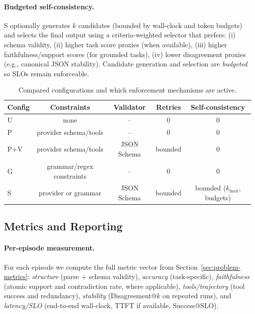 \documentclass[11pt]{article}
\newcommand{\slo}{\ensuremath{\mathrm{SLO}}}
\begin{document}
\paragraph{Budgeted self-consistency.}
S optionally generates $k$ candidates (bounded by wall-clock and token budgets) and selects the final output using a criteria-weighted selector that prefers:
(i) schema validity,
(ii) higher task score proxies (when available),
(iii) higher faithfulness/support scores (for grounded tasks),
(iv) lower disagreement proxies (e.g., canonical JSON stability).
Candidate generation and selection are \emph{budgeted} so SLOs remain enforceable.

\begin{table}[t]
\centering
\small
\begin{tabular}{@{}lcccc@{}}
\toprule
\textbf{Config} & \textbf{Constraints} & \textbf{Validator} & \textbf{Retries} & \textbf{Self-consistency} \\
\midrule
U   & none & -- & 0 & 0 \\
P   & provider schema/tools & -- & 0 & 0 \\
P+V & provider schema/tools & JSON Schema & bounded & 0 \\
G   & grammar/regex constraints & -- & 0 & 0 \\
S   & provider or grammar & JSON Schema & bounded & bounded ($k_{\max}$, budgets) \\
\bottomrule
\end{tabular}
\caption{Compared configurations and which enforcement mechanisms are active.}
\label{tab:config-summary}
\end{table}

\subsection{Metrics and Reporting}
\label{sec:metrics}
\label{sec:metrics-reporting}

\paragraph{Per-episode measurement.}
For each episode we compute the full metric vector from Section~\ref{sec:problem-metrics}:
\emph{structure} (parse + schema validity),
\emph{accuracy} (task-specific),
\emph{faithfulness} (atomic support and contradiction rate, where applicable),
\emph{tools/trajectory} (tool success and redundancy),
\emph{stability} (Disagreement@$k$ on repeated runs),
and \emph{latency/SLO} (end-to-end wall-clock, TTFT if available, Success@\slo).
\end{document}
